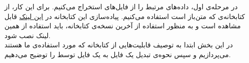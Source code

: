 در مرحله‌ی اول، داده‌های مرتبط را از فایل‌های
استخراج می‌کنیم. برای این کار، از کتابخانه‌ی
که متن‌باز است استفاده می‌کنیم.
پیاده‌سازی این کتابخانه در 
\href{https://github.com/aouinizied/nfstream}{‌این لینک}
قابل مشاهده است و به منظور استفاده از آخرین نسخه‌ی کتابخانه، باید استفاده از همین لینک نصب شود.\\
در این بخش ابتدا به توصیف قابلیت‌هایی از کتابخانه که مورد استفاده‌ی ما هستند می‌پردازیم و سپس نحوه‌ی  تبدیل یک فایل 
 به یک فایل  توسط  را توضیح می‌دهیم.\\